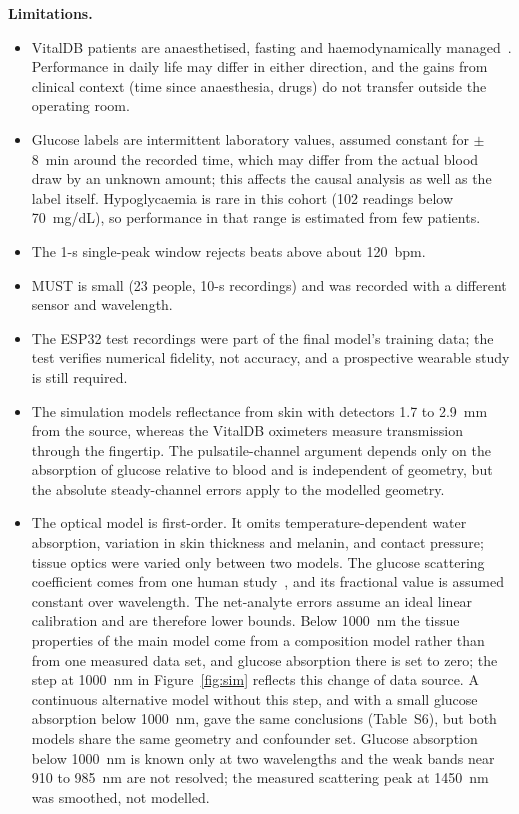 \documentclass[11pt]{article}
\newcommand{\mgdl}{mg/dL}
\begin{document}
\textbf{Limitations.}
\begin{itemize}[leftmargin=*]
\item VitalDB patients are anaesthetised, fasting and haemodynamically managed~\citep{lee2022vitaldb}. Performance in daily life may differ in either direction, and the gains from clinical context (time since anaesthesia, drugs) do not transfer outside the operating room.
\item Glucose labels are intermittent laboratory values, assumed constant for $\pm$8~min around the recorded time, which may differ from the actual blood draw by an unknown amount; this affects the causal analysis as well as the label itself. Hypoglycaemia is rare in this cohort (102 readings below 70~\mgdl{}), so performance in that range is estimated from few patients.
\item The 1-s single-peak window rejects beats above about 120~bpm.
\item MUST is small (23 people, 10-s recordings) and was recorded with a different sensor and wavelength.
\item The ESP32 test recordings were part of the final model's training data; the test verifies numerical fidelity, not accuracy, and a prospective wearable study is still required.
\item The simulation models reflectance from skin with detectors 1.7 to 2.9~mm from the source, whereas the VitalDB oximeters measure transmission through the fingertip. The pulsatile-channel argument depends only on the absorption of glucose relative to blood and is independent of geometry, but the absolute steady-channel errors apply to the modelled geometry.
\item The optical model is first-order. It omits temperature-dependent water absorption, variation in skin thickness and melanin, and contact pressure; tissue optics were varied only between two models. The glucose scattering coefficient comes from one human study~\citep{ge2024}, and its fractional value is assumed constant over wavelength. The net-analyte errors assume an ideal linear calibration and are therefore lower bounds. Below 1000~nm the tissue properties of the main model come from a composition model rather than from one measured data set, and glucose absorption there is set to zero; the step at 1000~nm in Figure~\ref{fig:sim} reflects this change of data source. A continuous alternative model without this step, and with a small glucose absorption below 1000~nm, gave the same conclusions (Table~S6), but both models share the same geometry and confounder set. Glucose absorption below 1000~nm is known only at two wavelengths and the weak bands near 910 to 985~nm are not resolved; the measured scattering peak at 1450~nm was smoothed, not modelled.
\end{itemize}
\end{document}
